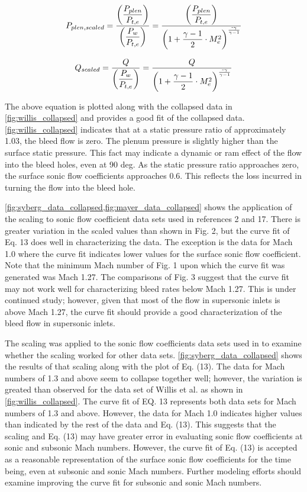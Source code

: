$$ P_{plen,scaled} = \dfrac{\qty(\dfrac{P_{plen}}{P_{t,e}})}{\qty(\dfrac{P_w}{P_{t,e}})} = \dfrac{\qty(\dfrac{P_{plen}}{P_{t,e}})}{\qty(1+\dfrac{\gamma-1}{2}\cdot M^2_e)^{\frac{\texttt{-}\gamma}{\gamma-1}}} $$


$$ Q_{scaled} = \dfrac{Q}{\qty(\dfrac{P_w}{P_{t,e}})} = \dfrac{Q}{\qty(1+\dfrac{\gamma-1}{2}\cdot M^2_e)^{\frac{\texttt{-}\gamma}{\gamma-1}}} $$

The above equation is plotted along with the collapsed data in \cref{fig:willis_collapsed} and provides a good fit of the collapsed data. \cref{fig:willis_collapsed} indicates that at a static pressure ratio of approximately 1.03, the bleed flow is zero. The plenum pressure is slightly higher than the surface static pressure. This fact may indicate a dynamic or ram effect of the flow into the bleed holes, even at 90 deg. As the static pressure ratio approaches zero, the surface sonic flow coefficients approaches 0.6. This reflects the loss incurred in turning the flow into the bleed hole.

\cref{fig:syberg_data_collapsed,fig:mayer_data_collapsed} shows the application of the scaling to sonic flow coefficient data sets used in references 2 and 17. There is greater variation in the scaled values than shown in Fig. 2, but the curve fit of Eq. 13 does well in characterizing the data. The exception is the data for Mach 1.0 where the curve fit indicates lower values for the surface sonic flow coefficient. Note that the minimum Mach number of Fig. 1 upon which the curve fit was generated was Mach 1.27. The comparisons of Fig. 3 suggest that the curve fit may not work well for characterizing bleed rates below Mach 1.27. This is under continued study; however, given that most of the flow in supersonic inlets is above Mach 1.27, the curve fit should provide a good characterization of the bleed flow in supersonic inlets.

The scaling was applied to the sonic flow coefficients data sets used in \cite{Syberg1973,Mayer1994} to examine whether the scaling worked for other data sets. \cref{fig:syberg_data_collapsed} shows the results of that scaling along with the plot of Eq. (13). The data for Mach numbers of 1.3 and above seem to collapse together well; however, the variation is greated than observed for the data set of Willis et al. as shown in \cref{fig:willis_collapsed}. The curve fit of EQ. 13 represents both data sets for Mach numbers of 1.3 and above. However, the data for Mach 1.0 indicates higher values than indicated by the rest of the data and Eq. (13). This suggests that the scaling and Eq. (13) may have greater error in evaluating sonic flow coefficients at sonic and subsonic Mach numbers. However, the curve fit of Eq. (13) is accepted as a reasonable representation of the surface sonic flow coefficients for the time being, even at subsonic and sonic Mach numbers. Further modeling efforts should examine improving the curve fit for subsonic and sonic Mach numbers.

